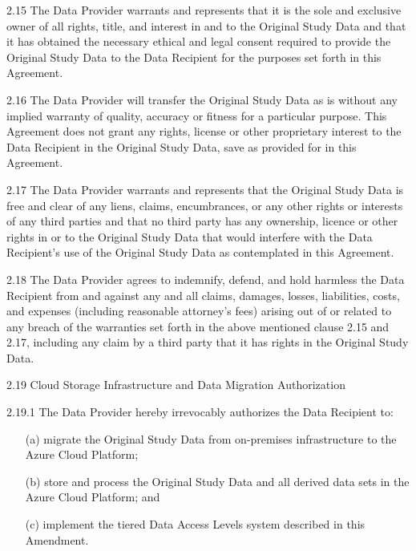 \documentclass[12pt,letterpaper]{article}
\newcommand{\added}[1]{\textcolor{addcolor}{#1}}
\begin{document}
2.15 The Data Provider warrants and represents that it is the sole and exclusive owner of all rights, title, and interest in and to the Original Study Data and that it has obtained the necessary ethical and legal consent required to provide the Original Study Data to the Data Recipient for the purposes set forth in this Agreement.

2.16 The Data Provider will transfer the Original Study Data as is without any implied warranty of quality, accuracy or fitness for a particular purpose. This Agreement does not grant any rights, license or other proprietary interest to the Data Recipient in the Original Study Data, save as provided for in this Agreement.

2.17 The Data Provider warrants and represents that the Original Study Data is free and clear of any liens, claims, encumbrances, or any other rights or interests of any third parties and that no third party has any ownership, licence or other rights in or to the Original Study Data that would interfere with the Data Recipient's use of the Original Study Data as contemplated in this Agreement.

2.18 The Data Provider agrees to indemnify, defend, and hold harmless the Data Recipient from and against any and all claims, damages, losses, liabilities, costs, and expenses (including reasonable attorney's fees) arising out of or related to any breach of the warranties set forth in the above mentioned clause 2.15 and 2.17, including any claim by a third party that it has rights in the Original Study Data.

\added{2.19 Cloud Storage Infrastructure and Data Migration Authorization}

\added{2.19.1 The Data Provider hereby irrevocably authorizes the Data Recipient to:
\begin{enumerate}
\item[(a)] migrate the Original Study Data from on-premises infrastructure to the Azure Cloud Platform;
\item[(b)] store and process the Original Study Data and all derived data sets in the Azure Cloud Platform; and
\item[(c)] implement the tiered Data Access Levels system described in this Amendment.
\end{enumerate}}
\end{document}
